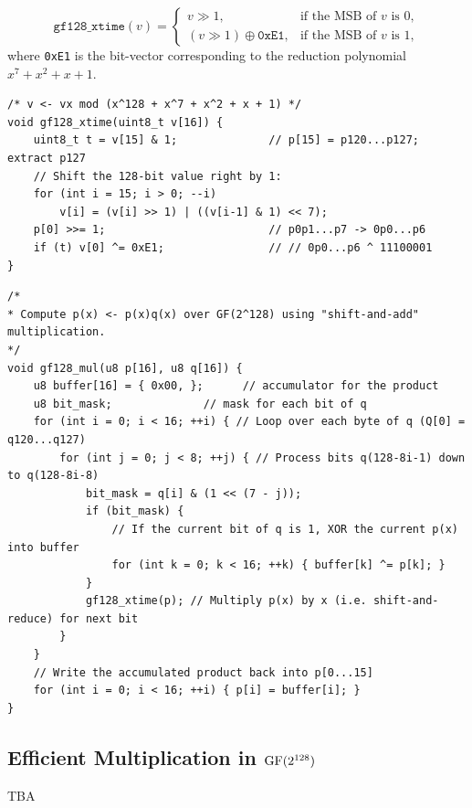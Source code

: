 \[
\mathtt{gf128\_xtime}(v) = 
\begin{cases}
	v \gg 1, &\text{if the MSB of }v\text{ is }0,\\[6pt]
	(v \gg 1)\oplus\texttt{0xE1}, &\text{if the MSB of }v\text{ is }1,
\end{cases}
\]
where \texttt{0xE1} is the bit-vector corresponding to the reduction polynomial
\(x^7+x^2+x+1\).
\vfill
\begin{lstlisting}[style=cstyle]
/* v <- vx mod (x^128 + x^7 + x^2 + x + 1) */
void gf128_xtime(uint8_t v[16]) {
	uint8_t t = v[15] & 1;				// p[15] = p120...p127; extract p127
	// Shift the 128-bit value right by 1:
	for (int i = 15; i > 0; --i)		
		v[i] = (v[i] >> 1) | ((v[i-1] & 1) << 7);
	p[0] >>= 1;							// p0p1...p7 -> 0p0...p6
	if (t) v[0] ^= 0xE1;                // // 0p0...p6 ^ 11100001
}
\end{lstlisting}

\begin{lstlisting}[style=cstyle]
/*
* Compute p(x) <- p(x)q(x) over GF(2^128) using "shift-and-add" multiplication.
*/
void gf128_mul(u8 p[16], u8 q[16]) {
	u8 buffer[16] = { 0x00, };      // accumulator for the product
	u8 bit_mask;              // mask for each bit of q
	for (int i = 0; i < 16; ++i) { // Loop over each byte of q (Q[0] = q120...q127)
		for (int j = 0; j < 8; ++j) { // Process bits q(128-8i-1) down to q(128-8i-8)
			bit_mask = q[i] & (1 << (7 - j));
			if (bit_mask) {
				// If the current bit of q is 1, XOR the current p(x) into buffer
				for (int k = 0; k < 16; ++k) { buffer[k] ^= p[k]; }
			}
			gf128_xtime(p); // Multiply p(x) by x (i.e. shift-and-reduce) for next bit
		}
	}
	// Write the accumulated product back into p[0...15]
	for (int i = 0; i < 16; ++i) { p[i] = buffer[i]; }
}
\end{lstlisting}
\newpage

\subsection{Efficient Multiplication in $\operatorname{GF}(2^{128})$}
TBA
